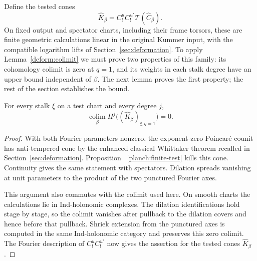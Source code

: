 Define the tested cones
\begin{equation}\label{planch:tested-cones}
 \widehat K_\beta
   =C_!^u C_!^{u'}\widehat{\mathcal T}(\widehat C_\beta).
\end{equation}
On fixed output and spectator charts, including their frame torsors,
these are finite geometric calculations linear in the original Kummer
input, with the compatible logarithm lifts of
Section~\ref{sec:deformation}.  To apply Lemma~\ref{deform:colimit} we
must prove two properties of this family: its cohomology colimit is zero
at $q=1$, and its weights in each stalk degree have an upper bound
independent of $\beta$.  The next lemma proves the first property; the
rest of the section establishes the bound.

\begin{lemma}
\label{planch:zero-colimit}
For every stalk $\xi$ on a test chart and every degree $j$,
\[
 \operatorname*{colim}_\beta
       H^j\bigl((\widehat K_\beta)_{\xi,q=1}\bigr)=0.
\]
\end{lemma}

\begin{proof}
With both Fourier parameters nonzero, the exponent-zero Poincar\'e
counit has anti-tempered cone by the enhanced classical Whittaker
theorem recalled in Section~\ref{sec:deformation}.  Proposition~
\ref{planch:finite-test} kills this cone.  Continuity gives the same
statement with spectators.  Dilation spreads vanishing at unit
parameters to the product of the two punctured Fourier axes.

This argument also commutes with the colimit used here.  On smooth
charts the calculations lie in Ind-holonomic complexes.  The dilation
identifications hold stage by stage, so the colimit vanishes after
pullback to the dilation covers and hence before that pullback.
Shriek extension from the punctured axes is computed in the same
Ind-holonomic category and preserves this zero colimit.  The Fourier
description of $C_!^u C_!^{u'}$ now gives the assertion for the
tested cones $\widehat K_\beta$.
\end{proof}

